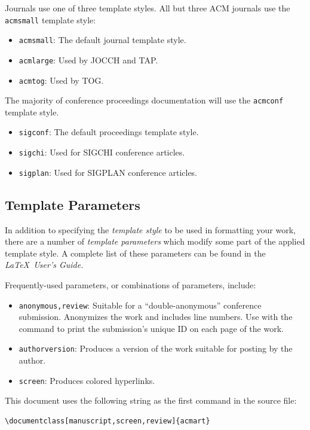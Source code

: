 \documentclass[manuscript,screen,review]{acmart}
\begin{document}
Journals use one of three template styles. All but three ACM journals
use the {\verb|acmsmall|} template style:
\begin{itemize}
\item {\texttt{acmsmall}}: The default journal template style.
\item {\texttt{acmlarge}}: Used by JOCCH and TAP.
\item {\texttt{acmtog}}: Used by TOG.
\end{itemize}

The majority of conference proceedings documentation will use the {\verb|acmconf|} template style.
\begin{itemize}
\item {\texttt{sigconf}}: The default proceedings template style.
\item{\texttt{sigchi}}: Used for SIGCHI conference articles.
\item{\texttt{sigplan}}: Used for SIGPLAN conference articles.
\end{itemize}

\subsection{Template Parameters}

In addition to specifying the {\itshape template style} to be used in
formatting your work, there are a number of {\itshape template parameters}
which modify some part of the applied template style. A complete list
of these parameters can be found in the {\itshape \LaTeX\ User's Guide.}

Frequently-used parameters, or combinations of parameters, include:
\begin{itemize}
\item {\texttt{anonymous,review}}: Suitable for a ``double-anonymous''
  conference submission. Anonymizes the work and includes line
  numbers. Use with the \texttt{\string\acmSubmissionID} command to print the
  submission's unique ID on each page of the work.
\item{\texttt{authorversion}}: Produces a version of the work suitable
  for posting by the author.
\item{\texttt{screen}}: Produces colored hyperlinks.
\end{itemize}

This document uses the following string as the first command in the
source file:
\begin{verbatim}
\documentclass[manuscript,screen,review]{acmart}
\end{verbatim}
\end{document}
